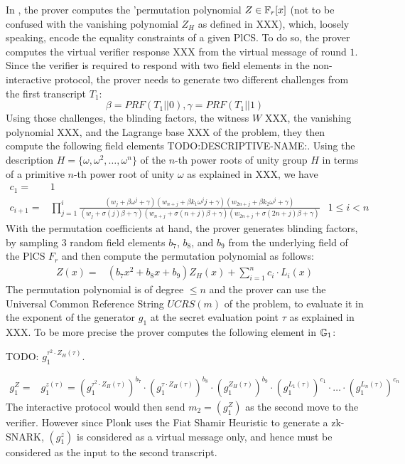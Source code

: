 In , the prover computes the 'permutation polynomial $Z\in \mathbb{F}_r[x]$ (not to be confused with the vanishing polynomial $Z_H$ as defined in XXX), which, loosely speaking, encode the equality constraints of a given PlCS. To do so, the prover computes the virtual verifier response XXX from the virtual message of round $1$. Since the verifier is required to respond with two field elements in the non-interactive protocol, the prover needs to generate two different challenges from the first transcript $T_1$: 
\begin{equation}
\beta=PRF(T_1 || 0), \gamma=PRF(T_1 || 1)
\end{equation}
Using those challenges, the blinding factors, the witness $W$ XXX, the vanishing polynomial XXX, and the Lagrange base XXX of the problem, they then compute the following field elements TODO:DESCRIPTIVE-NAME:. Using the description $H=\{\omega,\omega^2, \ldots, \omega^n\}$ of the $n$-th power roots of unity group $H$ in terms of a primitive $n$-th power root of unity $\omega$ as explained in XXX, we have
\begin{equation}
\begin{array}{rll}
c_1 = & 1\\
c_{i+1} = & \prod_{j=1}^i \frac{(w_j+\beta\omega^j+\gamma)(w_{n+j}+\beta k_1\omega^jj+\gamma)(w_{2n+j}+\beta k_2\omega^j+\gamma)}{(w_j+\sigma(j)\beta+\gamma)(w_{n+j}+\sigma(n+j)\beta+\gamma)(w_{2n+j}+\sigma(2n+j)\beta+\gamma)} & 1\leq i <n
\end{array}
\end{equation}
With the permutation coefficients at hand, the prover generates blinding factors, by sampling $3$ random field elements $b_7$, $b_8$, and $b_9$ from the underlying field of the PlCS $F_r$ and then compute the permutation polynomial as follows:
\begin{equation}
\begin{array}{rl}
Z(x) = & (b_7x^2+b_8x+b_9)Z_H(x)+\sum_{i=1}^{n} c_i\cdot L_{i}(x)
\end{array}
\end{equation}
The permutation polynomial is of degree $\leq n$ and the prover can use the Universal Common Reference String $UCRS(m)$ of the problem, to evaluate it in the exponent of the generator $g_1$ at the secret evaluation point $\tau$ as explained in XXX. To be more precise the prover computes the following element in $\mathbb{G}_1$: 

TODO: $g_1^{\tau^2\cdot Z_H(\tau)}$.

\begin{equation}
\begin{array}{rl}
g_1^Z = & g_1^{z(\tau)} = \left(g_1^{\tau^2\cdot Z_H(\tau)}\right)^{b_7}\cdot
\left(g_1^{\tau\cdot Z_H(\tau)}\right)^{b_8}\cdot\left(g_1^{Z_H(\tau)}\right)^{b_9}\cdot \left(g_1^{L_1(\tau)}\right)^{c_1}\cdot\ldots\cdot \left(g_1^{L_n(\tau)}\right)^{c_n}
\end{array}
\end{equation}
The interactive protocol would then send $m_2=(g_1^Z)$ as the second move to the verifier. However since Plonk uses the Fiat Shamir Heuristic to generate a zk-SNARK, $(g_1^z)$ is considered as a virtual message only, and hence must be considered as the input to the second transcript.

